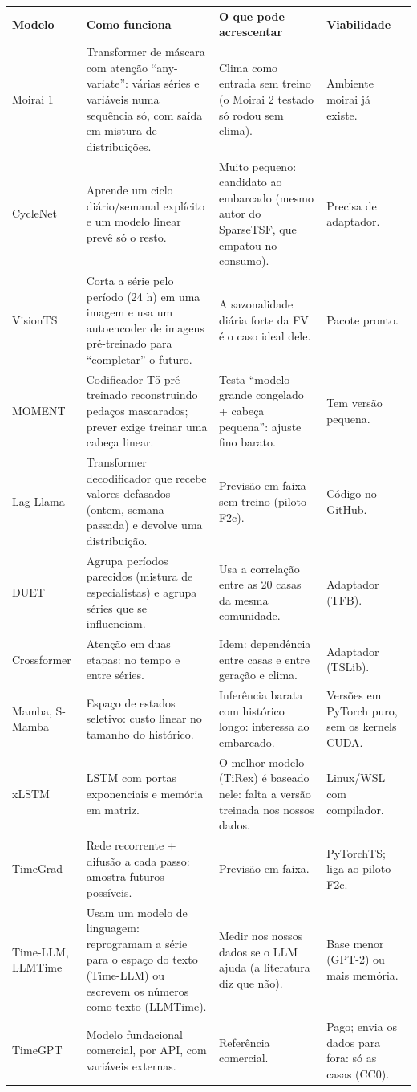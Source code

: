 \documentclass[10pt,a4paper]{article}
\newcommand{\cab}[1]{\cellcolor{acento}\color{white}\bfseries #1}
\begin{document}
\begin{tabularx}{\linewidth}{@{}>{\raggedright\arraybackslash}p{2.0cm}YY>{\raggedright\arraybackslash}p{3.3cm}@{}}
\cab{Modelo} & \cab{Como funciona} & \cab{O que pode acrescentar} & \cab{Viabilidade} \\
Moirai 1 & Transformer de máscara com atenção ``any-variate'': várias séries e variáveis numa sequência
  só, com saída em mistura de distribuições. & Clima como entrada sem treino (o Moirai 2 testado só
  rodou sem clima). & Ambiente moirai já existe. \\
CycleNet & Aprende um ciclo diário/semanal explícito e um modelo linear prevê só o resto. & Muito pequeno:
  candidato ao embarcado (mesmo autor do SparseTSF, que empatou no consumo). & Precisa de adaptador. \\
VisionTS & Corta a série pelo período (24 h) em uma imagem e usa um autoencoder de imagens pré-treinado
  para ``completar'' o futuro. & A sazonalidade diária forte da FV é o caso ideal dele. & Pacote pronto. \\
MOMENT & Codificador T5 pré-treinado reconstruindo pedaços mascarados; prever exige treinar uma
  cabeça linear. & Testa ``modelo grande congelado + cabeça pequena'': ajuste fino barato. & Tem versão pequena. \\
Lag-Llama & Transformer decodificador que recebe valores defasados (ontem, semana passada) e devolve uma
  distribuição. & Previsão em faixa sem treino (piloto F2c). & Código no GitHub. \\
DUET & Agrupa períodos parecidos (mistura de especialistas) e agrupa séries que se influenciam. &
  Usa a correlação entre as 20 casas da mesma comunidade. & Adaptador (TFB). \\
Crossformer & Atenção em duas etapas: no tempo e entre séries. & Idem: dependência entre casas e entre
  geração e clima. & Adaptador (TSLib). \\
Mamba, S-Mamba & Espaço de estados seletivo: custo linear no tamanho do histórico. & Inferência
  barata com histórico longo: interessa ao embarcado. & Versões em PyTorch puro, sem os kernels CUDA. \\
xLSTM & LSTM com portas exponenciais e memória em matriz. & O melhor modelo (TiRex) é baseado nele:
  falta a versão treinada nos nossos dados. & Linux/WSL com compilador. \\
TimeGrad & Rede recorrente + difusão a cada passo: amostra futuros possíveis. & Previsão em faixa. &
  PyTorchTS; liga ao piloto F2c. \\
Time-LLM, LLMTime & Usam um modelo de linguagem: reprogramam a série para o espaço do texto (Time-LLM) ou
  escrevem os números como texto (LLMTime). & Medir nos nossos dados se o LLM ajuda (a literatura diz que
  não). & Base menor (GPT-2) ou mais memória. \\
TimeGPT & Modelo fundacional comercial, por API, com variáveis externas. & Referência comercial. & Pago;
  envia os dados para fora: só as casas (CC0). \\
\end{tabularx}
\end{document}
